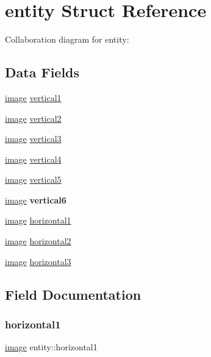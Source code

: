\hypertarget{structentity}{}\section{entity Struct Reference}
\label{structentity}


Collaboration diagram for entity\+:
\subsection*{Data Fields}
\begin{DoxyCompactItemize}
\item 
\hyperlink{structimage}{image} \hyperlink{structentity_aebbf7297dde20fdb9a7d5a599909a0b1}{vertical1}
\item 
\hyperlink{structimage}{image} \hyperlink{structentity_a86d318d932e9df2902488d0aa936b325}{vertical2}
\item 
\hyperlink{structimage}{image} \hyperlink{structentity_a7aee627c58fe68ce10509ce6f001a258}{vertical3}
\item 
\hyperlink{structimage}{image} \hyperlink{structentity_aee5d2aa38170a69600a5a1e1dda3d3ff}{vertical4}
\item 
\hyperlink{structimage}{image} \hyperlink{structentity_a3af8b43e0be3b75cf97b176291d79bdf}{vertical5}
\item 
\mbox{\label{structentity_ab82f2d56dd0e9a5c875508b23d20c84e}} 
\hyperlink{structimage}{image} {\bfseries vertical6}
\item 
\hyperlink{structimage}{image} \hyperlink{structentity_a14d079ec6f5a3df7a802a0bee54fa627}{horizontal1}
\item 
\hyperlink{structimage}{image} \hyperlink{structentity_a098f16f574a5f6b1241bfd513f02860d}{horizontal2}
\item 
\hyperlink{structimage}{image} \hyperlink{structentity_a06e43707b5904cea43d244b1b51a2387}{horizontal3}
\end{DoxyCompactItemize}


\subsection{Field Documentation}
\mbox{\label{structentity_a14d079ec6f5a3df7a802a0bee54fa627}} 
\subsubsection{\texorpdfstring{horizontal1}{horizontal1}}
{\footnotesize\ttfamily \hyperlink{structimage}{image} entity\+::horizontal1}

